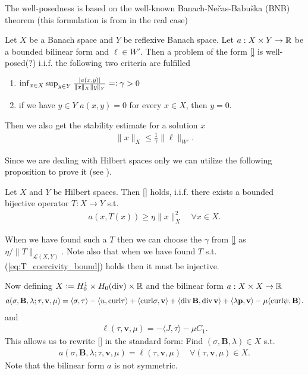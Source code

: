 \documentclass[../master_thesis.tex]{subfiles}
\begin{document}
The well-posedness is based on the well-known Banach-Nečas-Babuška (BNB) theorem 
(this formulation is from \cite[Sec.\,25.3]{ern_guermond} in the real case)

\begin{theorem}[BNB]
    Let $X$ be a Banach space and $Y$ be reflexive Banach space. Let $a:X\times Y \rightarrow \mathbb{R}$ be a 
    bounded bilinear form and $\ell \in W'$. Then a problem of the form 
    \ref{} is well-posed(?) i.i.f. the following two criteria are fulfilled
    \begin{enumerate}
        \item $\inf_{x \in X} \sup_{y\in Y} \frac{|a(x,y)|}{\lVert x \rVert _X \lVert y \rVert _Y} 
        =\vcentcolon \gamma > 0$
        \item if we have $y \in Y$ $a(x,y) = 0$ for every $x \in X$, then $y=0$.
    \end{enumerate}
    Then we also get the stability estimate for a solution $x$
    \begin{align*}
        \lVert x \rVert _X \leq \frac{1}{\gamma} \lVert \ell\rVert _{W'}.
    \end{align*}
\end{theorem}

Since we are dealing with Hilbert spaces only we can utilize the following proposition to prove it 
(see \cite[Rem.\,25.14]{ern_guermond}).
\begin{proposition}[$T$-coercivity]
    Let $X$ and $Y$ be Hilbert spaces. Then \ref{} holds, i.i.f.
    there exists a bounded bijective operator $T:X \rightarrow Y$ s.t.
    \begin{align}
        a(x,T(x)) \geq \eta \lVert x \rVert _X^2 \quad \forall x \in X. \label{eq:T_coercivity_bound}
    \end{align}
\end{proposition}
When we have found such a $T$ then 
we can choose the $\gamma$ from \ref{} as $\eta/\lVert T \rVert _{\mathcal{L}(X,Y)}$. 
Note also that when we have found $T$ s.t. (\ref{eq:T_coercivity_bound}) holds 
then it must be injective.


Now defining $X \vcentcolon= H^1_0 \times H_0(\operatorname{div}) \times \mathbb{R}$ and the 
bilinear form $a:X\times X \rightarrow \mathbb{R}$
\begin{align*}
    a(\sigma,\mathbf{B}, \lambda;\tau,\mathbf{v},\mu) 
    =   \langle \sigma, \tau \rangle - \langle u, \mathbf{\operatorname{curl}}\tau \rangle
        + \langle \mathbf{\operatorname{curl}}\sigma, \mathbf{v} \rangle + \langle \operatorname{div} \mathbf{B}, \operatorname{div} \mathbf{v} \rangle 
        + \langle \lambda \mathbf{p}, \mathbf{v} \rangle - \mu \langle \mathbf{\operatorname{curl}} \psi, \mathbf{B} \rangle.
\end{align*}
and 
\begin{align*}
    \ell(\tau,\mathbf{v},\mu) = -\langle J, \tau \rangle - \mu C_1.
\end{align*}
This allows us to rewrite \ref{} in the standard form: Find $(\sigma,\mathbf{B},\lambda) \in 
X$ s.t.
\begin{align*}
    a(\sigma,\mathbf{B},\lambda;\tau,\mathbf{v},\mu) = \ell(\tau,\mathbf{v},\mu)
        \quad \forall (\tau,\mathbf{v},\mu) \in X.
\end{align*}
Note that the bilinear form $a$ is not symmetric. 
\end{document}
